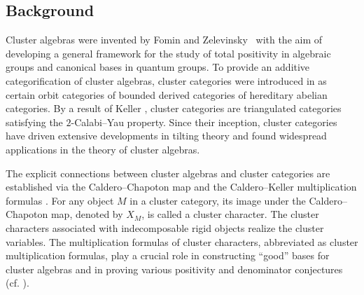\documentclass[reqno,12pt]{amsart}
\numberwithin{equation}{section}
\theoremstyle{plain} %
\theoremstyle{definition} %
\begin{document}
\subsection{Background}
Cluster algebras were invented by Fomin and Zelevinsky~\cite{FZ} with the aim of developing a general framework for the study of total positivity in algebraic groups and canonical bases in quantum groups. To provide an additive categorification of cluster algebras, cluster categories were introduced in \cite{BMRRT} as certain orbit categories of bounded derived categories of hereditary abelian categories. By a result of Keller \cite{Keller}, cluster categories are triangulated categories satisfying the $2$-Calabi--Yau property. Since their inception, cluster categories have driven extensive developments in tilting theory and found widespread applications in the theory of cluster algebras.


The explicit connections between cluster algebras and cluster categories are established via the Caldero--Chapoton map \cite{CC} and the Caldero--Keller multiplication formulas \cite{CK2005, CK2}. For any object $M$ in a cluster category, its image under the Caldero--Chapoton map, denoted by $X_M$, is called a cluster character. The cluster characters associated with indecomposable rigid objects realize the cluster variables. The multiplication formulas of cluster characters, abbreviated as cluster multiplication formulas, play a crucial role in constructing ``good'' bases for cluster algebras and in proving various positivity and denominator conjectures (cf. \cite{CK2005, CK2, DXChen, DXX, Yang}).
\end{document}

